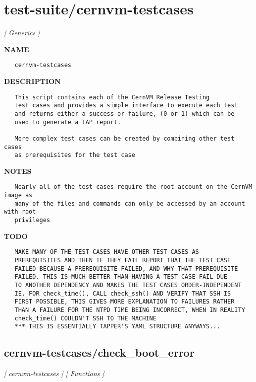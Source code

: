 \section{test-suite/cernvm-testcases}
\textsl{[ Generics ]}

\label{ch:robo29}
\label{ch:test_suite_cernvm_testcases}
\textbf{NAME}
\begin{verbatim}
   cernvm-testcases
\end{verbatim}
\textbf{DESCRIPTION}
\begin{verbatim}
   This script contains each of the CernVM Release Testing
   test cases and provides a simple interface to execute each test
   and returns either a success or failure, (0 or 1) which can be 
   used to generate a TAP report.

   More complex test cases can be created by combining other test cases
   as prerequisites for the test case
\end{verbatim}
\textbf{NOTES}
\begin{verbatim}
   Nearly all of the test cases require the root account on the CernVM image as 
   many of the files and commands can only be accessed by an account with root 
   privileges
\end{verbatim}
\textbf{TODO}
\begin{verbatim}
   MAKE MANY OF THE TEST CASES HAVE OTHER TEST CASES AS
   PREREQUISITES AND THEN IF THEY FAIL REPORT THAT THE TEST CASE
   FAILED BECAUSE A PREREQUISITE FAILED, AND WHY THAT PREREQUISITE
   FAILED. THIS IS MUCH BETTER THAN HAVING A TEST CASE FAIL DUE
   TO ANOTHER DEPENDENCY AND MAKES THE TEST CASES ORDER-INDEPENDENT
   IE. FOR check_time(), CALL check_ssh() AND VERIFY THAT SSH IS
   FIRST POSSIBLE, THIS GIVES MORE EXPLANATION TO FAILURES RATHER
   THAN A FAILURE FOR THE NTPD TIME BEING INCORRECT, WHEN IN REALITY
   check_time() COULDN'T SSH TO THE MACHINE
   *** THIS IS ESSENTIALLY TAPPER'S YAML STRUCTURE ANYWAYS...
\end{verbatim}
\newpage
\subsection{cernvm-testcases/check\_boot\_error}
\textsl{[ cernvm-testcases ]}
\textsl{[ Functions ]}

